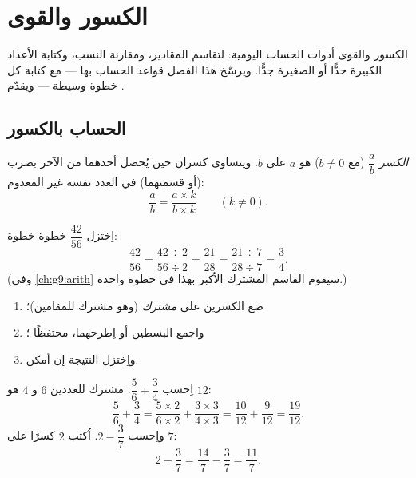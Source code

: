 \chapter{الكسور والقوى}\label{ch:g9:fractions}

الكسور والقوى أدوات الحساب اليومية: لتقاسم
المقادير، ومقارنة النسب، وكتابة الأعداد الكبيرة جدًّا أو الصغيرة
جدًّا. ويرسّخ هذا الفصل قواعد الحساب بها ---
مع كتابة كل خطوة وسيطة --- ويقدّم .

\section{الحساب بالكسور}

\begin{definition}[الكسر]\label{def:g9:fractions:fraction}
\emph{الكسر} $\dfrac ab$ (مع $b \neq 0$) هو
 $a$ على $b$. ويتساوى كسران حين يُحصل أحدهما من
الآخر بضرب   (أو قسمتهما) في
العدد نفسه غير المعدوم:
\[
\frac ab = \frac{a \times k}{b \times k} \qquad (k \neq 0).
\]
\end{definition}

\begin{example}\label{ex:g9:fractions:simplify}
اِختزل $\dfrac{42}{56}$ خطوة خطوة:
\[
\frac{42}{56} = \frac{42 \div 2}{56 \div 2} = \frac{21}{28}
= \frac{21 \div 7}{28 \div 7} = \frac34 .
\]
(وفي \cref{ch:g9:arith} سيقوم القاسم المشترك الأكبر بهذا في خطوة
واحدة.)
\end{example}

\begin{method}\label{met:g9:fractions:add}
\begin{enumerate}
  \item ضع الكسرين على \emph{ مشترك} (وهو 
        مشترك للمقامين)؛
  \item واجمع البسطين أو اِطرحهما، محتفظًا ؛
  \item واِختزل النتيجة إن أمكن.
\end{enumerate}
\end{method}

\begin{example}\label{ex:g9:fractions:add}
اِحسب $\dfrac56 + \dfrac34$.  مشترك للعددين $6$ و $4$ هو
$12$:
\[
\frac56 + \frac34
= \frac{5 \times 2}{6 \times 2} + \frac{3 \times 3}{4 \times 3}
= \frac{10}{12} + \frac{9}{12}
= \frac{19}{12}.
\]
واِحسب $2 - \dfrac37$. اُكتب $2$ كسرًا على  $7$:
\[
2 - \frac37 = \frac{14}{7} - \frac37 = \frac{11}{7}.
\]
\end{example}

